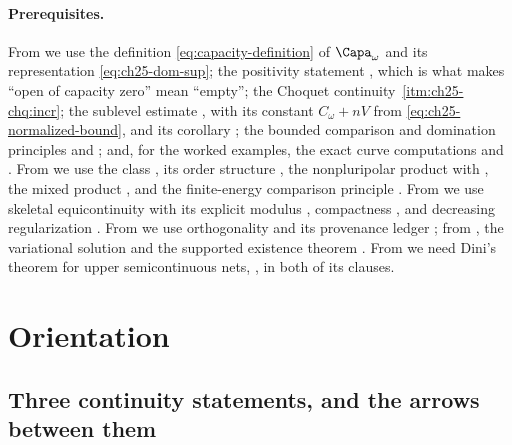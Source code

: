\paragraph{Prerequisites.}
From  we use the definition
\eqref{eq:capacity-definition} of \(\Capa_\omega\) and its representation
\eqref{eq:ch25-dom-sup}; the positivity statement
, which is what makes ``open of
capacity zero'' mean ``empty''; the Choquet continuity
\,\cref{itm:ch25-chq:incr}; the sublevel
estimate , with its constant
\(C_\omega+nV\) from \eqref{eq:ch25-normalized-bound}, and its corollary
; the bounded comparison and domination
principles  and
; and, for the worked examples, the
exact curve computations
 and
.  From
 we use the class , its order structure
, the nonpluripolar product
 with , the mixed
product , and the finite-energy comparison
principle .  From
 we use skeletal equicontinuity
 with its explicit modulus
, compactness
, and decreasing regularization
.  From
 we use orthogonality
 and its provenance ledger
; from
, the variational solution
 and the supported existence
theorem .  From
 we need Dini's theorem for upper
semicontinuous nets, , in both of its clauses.

\section{Orientation}
\label{sec:ch29-orientation}

\subsection{Three continuity statements, and the arrows between them}
\label{sec:ch29-three-continuities}

